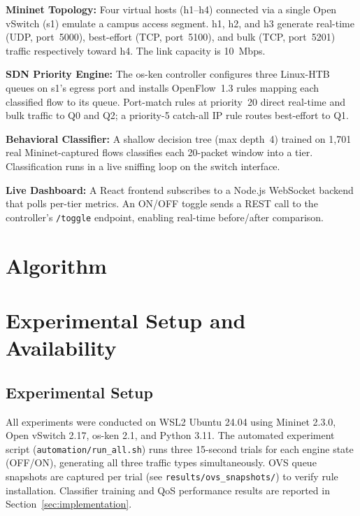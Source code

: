 \documentclass[conference]{IEEEtran}
\begin{document}
\textbf{Mininet Topology:} Four virtual hosts (h1–h4) connected via
a single Open vSwitch (s1) emulate a campus access segment. h1, h2,
and h3 generate real-time (UDP, port~5000), best-effort (TCP, port~5100),
and bulk (TCP, port~5201) traffic respectively toward h4. The link
capacity is 10~Mbps.

\textbf{SDN Priority Engine:} The os-ken controller configures three
Linux-HTB queues on s1's egress port and installs OpenFlow~1.3 rules
mapping each classified flow to its queue. Port-match rules at
priority~20 direct real-time and bulk traffic to Q0 and Q2; a
priority-5 catch-all IP rule routes best-effort to Q1.

\textbf{Behavioral Classifier:} A shallow decision tree (max depth~4)
trained on 1,701 real Mininet-captured flows classifies each 20-packet
window into a tier. Classification runs in a live sniffing loop on the
switch interface.

\textbf{Live Dashboard:} A React frontend subscribes to a Node.js
WebSocket backend that polls per-tier metrics. An ON/OFF toggle sends
a REST call to the controller's \texttt{/toggle} endpoint, enabling
real-time before/after comparison.

\section{Algorithm}
\label{sec:algorithm}



\section{Experimental Setup and Availability}
\label{sec:results-analysis}

\subsection{Experimental Setup}

All experiments were conducted on WSL2 Ubuntu 24.04 using Mininet
2.3.0, Open vSwitch 2.17, os-ken 2.1, and Python 3.11. The automated
experiment script (\texttt{automation/run\_all.sh}) runs three 15-second
trials for each engine state (OFF/ON), generating all three traffic
types simultaneously. OVS queue snapshots are captured per trial
(see \texttt{results/ovs\_snapshots/}) to verify rule installation.
Classifier training and QoS performance results are reported in
Section~\ref{sec:implementation}.
\end{document}
